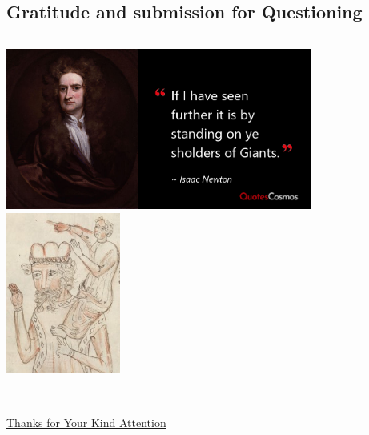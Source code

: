\documentclass[11pt,aspectratio=169]{beamer}
\begin{document}
	\subsection{Gratitude and submission for Questioning}
	\begin{frame}
		\begin{columns}
		
			\includegraphics[width=\textwidth,  height=150pt]{./assets/Isaac.png}
			\includegraphics[width=\textwidth,  height=150pt]{./assets/stand.jpg}
		\end{columns}
	
	\begin{columns}
		\column{\textwidth}
		\\
			\centering \huge{\underline{Thanks for Your Kind Attention}}
	\end{columns}
	\end{frame}
\end{document}
